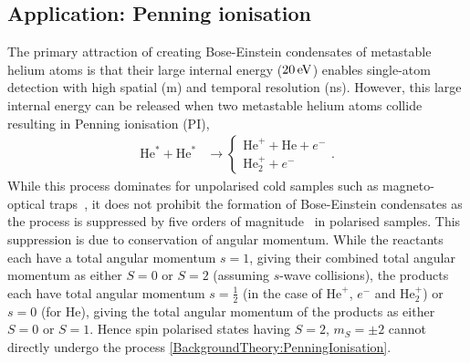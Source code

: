 
\subsection{Application: Penning ionisation}
\label{BackgroundTheory:PenningIonisation}

The primary attraction of creating Bose-Einstein condensates of metastable helium atoms is that their large internal energy ($\unit[20]{eV}$) enables single-atom detection with high spatial (\micro m) and temporal resolution (ns). However, this large internal energy can be released when two metastable helium atoms collide resulting in Penning ionisation (PI),
\begin{align}
    \label{BackgroundTheory:PenningIonisation}
    \text{He}^* + \text{He}^* & \rightarrow \left\{
        \begin{matrix}
            \text{He}^+ + \text{He} + e^-\\
            \text{He}_2^+ + e^-
        \end{matrix}\right..
\end{align}
While this process dominates for unpolarised cold samples such as magneto-optical traps~\citep{Bardou:1992}, it does not prohibit the formation of Bose-Einstein condensates as the process is suppressed by five orders of magnitude~\citep{Shlyapnikov:1994} in polarised samples.  This suppression is due to conservation of angular momentum. While the reactants each have a total angular momentum $s=1$, giving their combined total angular momentum as either $S=0$ or $S=2$ (assuming $s$-wave collisions), the products each have total angular momentum $s=\frac{1}{2}$ (in the case of $\text{He}^+$, $e^-$ and $\text{He}_2^+$) or $s=0$ (for $\text{He}$), giving the total angular momentum of the products as either $S=0$ or $S=1$. Hence spin polarised states having $S=2$, $m_S=\pm2$ cannot directly undergo the process \eqref{BackgroundTheory:PenningIonisation}.

